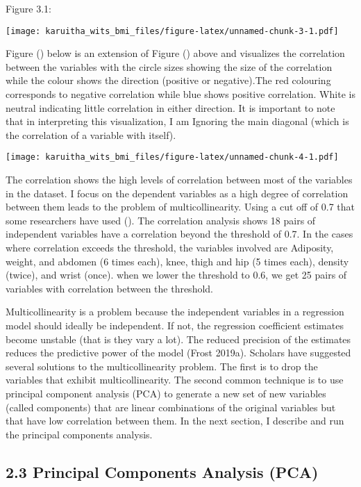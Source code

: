 \documentclass[
]{article}
\begin{document}
\begin{landscape}

Figure 3.1:

\texttt{[image: karuitha\_wits\_bmi\_files/figure-latex/unnamed-chunk-3-1.pdf]}

\end{landscape}

Figure () below is an extension of Figure () above and visualizes the
correlation between the variables with the circle sizes showing the size
of the correlation while the colour shows the direction (positive or
negative).The red colouring corresponds to negative correlation while
blue shows positive correlation. White is neutral indicating little
correlation in either direction. It is important to note that in
interpreting this visualization, I am Ignoring the main diagonal (which
is the correlation of a variable with itself).

\texttt{[image: karuitha\_wits\_bmi\_files/figure-latex/unnamed-chunk-4-1.pdf]}

The correlation shows the high levels of correlation between most of the
variables in the dataset. I focus on the dependent variables as a high
degree of correlation between them leads to the problem of
multicollinearity. Using a cut off of 0.7 that some researchers have
used (). The correlation analysis shows 18 pairs of independent
variables have a correlation beyond the threshold of 0.7. In the cases
where correlation exceeds the threshold, the variables involved are
Adiposity, weight, and abdomen (6 times each), knee, thigh and hip (5
times each), density (twice), and wrist (once). when we lower the
threshold to 0.6, we get 25 pairs of variables with correlation between
the threshold.

Multicollinearity is a problem because the independent variables in a
regression model should ideally be independent. If not, the regression
coefficient estimates become unstable (that is they vary a lot). The
reduced precision of the estimates reduces the predictive power of the
model (Frost 2019a). Scholars have suggested several solutions to the
multicollinearity problem. The first is to drop the variables that
exhibit multicollinearity. The second common technique is to use
principal component analysis (PCA) to generate a new set of new
variables (called components) that are linear combinations of the
original variables but that have low correlation between them. In the
next section, I describe and run the principal components analysis.

\hypertarget{principal-components-analysis-pca}{%
\subsection{\texorpdfstring{\textbf{2.3 Principal Components Analysis
(PCA)}}{2.3 Principal Components Analysis (PCA)}}\label{principal-components-analysis-pca}}
\end{document}
